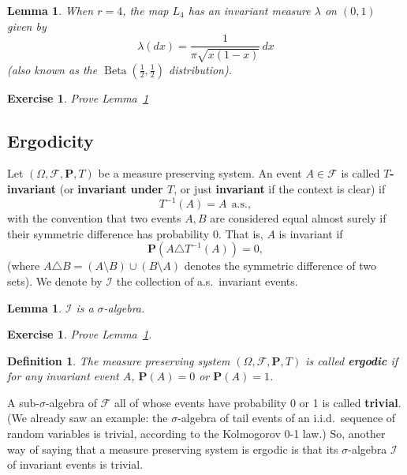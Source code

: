 \documentclass[12pt]{article}
\newtheorem{lem}[thm]{Lemma}
\newtheorem{defi}[thm]{Definition}
\newtheorem{exercise}[thm]{Exercise}
\newcommand{\prob}{\mathbf{P}}
\theoremstyle{example}
\begin{document}
\begin{enumerate}[1.]
\begin{lem} \label{lem-logistic-invariant}
When $r=4$, the map $L_4$ has an invariant measure $\lambda$ on $(0,1)$ given by
$$ \lambda(dx) = \frac{1}{\pi \sqrt{x(1-x)}}\,dx $$
(also known as the $\operatorname{Beta}(\tfrac12,\tfrac12)$ distribution).
\end{lem}

\begin{exercise} Prove Lemma~\ref{lem-logistic-invariant}
\end{exercise}



\end{enumerate}


\subsection{Ergodicity}

Let $(\Omega, \mathcal{F}, \prob, T)$ be a measure preserving system. An event $A\in\mathcal{F}$ is called \textbf{$T$-invariant} (or \textbf{invariant under $T$}, or just \textbf{invariant} if the context is clear) if $$ T^{-1}(A) = A \ \ \textrm{a.s.}, $$
with the convention that two events $A,B$ are considered equal almost surely if their symmetric difference has probability $0$. That is, $A$ is invariant if
$$ \prob(A\triangle T^{-1}(A)) = 0, $$
(where $A\triangle B = (A\setminus B)\cup (B\setminus A)$ denotes the symmetric difference of two sets).
We denote by $\mathcal{I}$ the collection of a.s.\ invariant events.

\begin{lem} \label{lem-invariant-sigmaalg}
$\mathcal{I}$ is a $\sigma$-algebra.
\end{lem}

\begin{exercise}
Prove Lemma~\ref{lem-invariant-sigmaalg}.
\end{exercise}

\begin{defi} The measure preserving system $(\Omega, \mathcal{F}, \prob, T)$ is called \textbf{ergodic} if for any invariant event $A$, $\prob(A)=0$ or $\prob(A)=1$.
\end{defi}

A sub-$\sigma$-algebra of $\mathcal{F}$ all of whose events have probability 0 or 1 is called \textbf{trivial}. (We already saw an example: the $\sigma$-algebra of tail events of an i.i.d.\ sequence of random variables is trivial, according to the Kolmogorov 0-1 law.) So, another way of saying that a measure preserving system is ergodic is that its $\sigma$-algebra $\mathcal{I}$ of invariant events is trivial.
\end{document}
